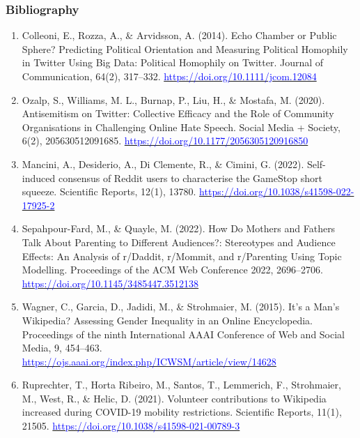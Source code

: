 \documentclass{beamer}
\begin{document}
\begin{frame}
    \frametitle{Bibliography}
    \tiny
    \begin{enumerate}
        \item Colleoni, E., Rozza, A., \& Arvidsson, A. (2014). Echo Chamber or Public Sphere? Predicting Political Orientation and Measuring Political Homophily in Twitter Using Big Data: Political Homophily on Twitter. Journal of Communication, 64(2), 317–332. \href{https://doi.org/10.1111/jcom.12084}{\textcolor{blue}{https://doi.org/10.1111/jcom.12084}}
        \item Ozalp, S., Williams, M. L., Burnap, P., Liu, H., \& Mostafa, M. (2020). Antisemitism on Twitter: Collective Efficacy and the Role of Community Organisations in Challenging Online Hate Speech. Social Media + Society, 6(2), 205630512091685. \href{https://doi.org/10.1177/2056305120916850}{\textcolor{blue}{https://doi.org/10.1177/2056305120916850}}
        \item Mancini, A., Desiderio, A., Di Clemente, R., \& Cimini, G. (2022). Self-induced consensus of Reddit users to characterise the GameStop short squeeze. Scientific Reports, 12(1), 13780. \href{https://doi.org/10.1038/s41598-022-17925-2}{\textcolor{blue}{https://doi.org/10.1038/s41598-022-17925-2}}
        \item Sepahpour-Fard, M., \& Quayle, M. (2022). How Do Mothers and Fathers Talk About Parenting to Different Audiences?: Stereotypes and Audience Effects: An Analysis of r/Daddit, r/Mommit, and r/Parenting Using Topic Modelling. Proceedings of the ACM Web Conference 2022, 2696–2706. \href{https://doi.org/10.1145/3485447.3512138}{\textcolor{blue}{https://doi.org/10.1145/3485447.3512138}}
        \item Wagner, C., Garcia, D., Jadidi, M., \& Strohmaier, M. (2015). It’s a Man’s Wikipedia? Assessing Gender Inequality in an Online Encyclopedia. Proceedings of the ninth International AAAI Conference of Web and Social Media, 9, 454–463. \href{https://ojs.aaai.org/index.php/ICWSM/article/view/14628}{\textcolor{blue}{https://ojs.aaai.org/index.php/ICWSM/article/view/14628}}
        \item Ruprechter, T., Horta Ribeiro, M., Santos, T., Lemmerich, F., Strohmaier, M., West, R., \& Helic, D. (2021). Volunteer contributions to Wikipedia increased during COVID-19 mobility restrictions. Scientific Reports, 11(1), 21505. \href{https://doi.org/10.1038/s41598-021-00789-3}{\textcolor{blue}{https://doi.org/10.1038/s41598-021-00789-3}}
    \end{enumerate}
    
\end{frame}
\end{document}
